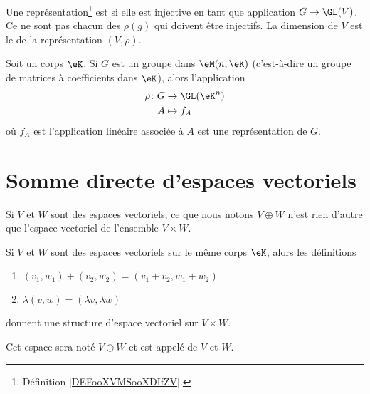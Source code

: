 \begin{definition}
    Une représentation\footnote{Définition \ref{DEFooXVMSooXDIfZV}.} est  si elle est injective en tant que application \( G\to \GL(V)\). Ce ne sont pas chacun des \( \rho(g)\) qui doivent être injectifs. La dimension de \( V\) est le  de la représentation \( (V,\rho)\).
\end{definition}

\begin{proposition}     \label{PROPooHNQOooSzeEFG}
    Soit un corps \( \eK\). Si \( G\) est un groupe dans \( \eM(n,\eK)\) (c'est-à-dire un groupe de matrices à coefficients dans \( \eK\)), alors l'application
    \begin{equation}
        \begin{aligned}
                \rho\colon G&\to \GL(\eK^n) \\
            A&\mapsto f_A 
        \end{aligned}
    \end{equation}
    où \( f_A\) est l'application linéaire associée à \( A\) est une représentation de \( G\).
\end{proposition}


\section{Somme directe d'espaces vectoriels}

Si \( V\) et \( W\) sont des espaces vectoriels, ce que nous notons \( V\oplus W\) n'est rien d'autre que l'espace vectoriel de l'ensemble \( V\times W\).

\begin{propositionDef}       \label{DEFooJKAWooKkkkwm}
    Si \( V\) et \( W\) sont des espaces vectoriels sur le même corps \( \eK\), alors les définitions
    \begin{enumerate}
        \item
            \( (v_1,w_1)+(v_2,w_2)=(v_1+v_2,w_1+w_2)\)
        \item
            \( \lambda(v,w)=(\lambda v,\lambda w)\)
    \end{enumerate}
    donnent une structure d'espace vectoriel sur \( V\times W\). 

    Cet espace sera noté \( V\oplus W\) et est appelé  de \( V\) et \( W\).
\end{propositionDef}

